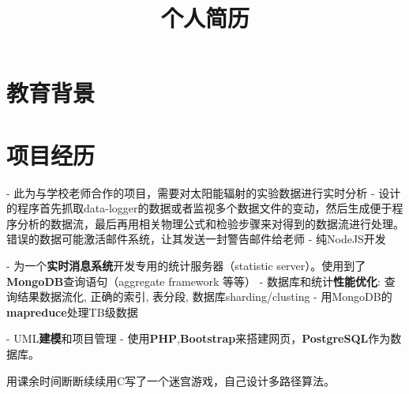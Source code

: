 \documentclass[11pt,a4paper]{moderncv}
\title{\normalsize 个人简历}
\begin{document}
\maketitle

\section{教育背景}


\section{项目经历}

{
- 此为与学校老师合作的项目，需要对太阳能辐射的实验数据进行实时分析\newline
- 设计的程序首先抓取data-logger的数据或者监视多个数据文件的变动，然后生成便于程序分析的数据流，最后再用相关物理公式和检验步骤来对得到的数据流进行处理。错误的数据可能激活邮件系统，让其发送一封警告邮件给老师\newline
- 纯NodeJS开发
}

\vspace*{0.2\baselineskip}
{
- 为一个\textbf{实时消息系统}开发专用的统计服务器（statistic server）。使用到了\textbf{MongoDB}查询语句（aggregate framework 等等）\newline
- 数据库和统计\textbf{性能优化}: 查询结果数据流化, 正确的索引, 表分段, 数据库sharding/clusting\newline
- 用MongoDB的\textbf{mapreduce}处理TB级数据
}

\vspace*{0.2\baselineskip}
{
- UML\textbf{建模}和项目管理\newline
- 使用\textbf{PHP},\textbf{Bootstrap}来搭建网页，\textbf{PostgreSQL}作为数据库。
}

\vspace*{0.2\baselineskip}
{用课余时间断断续续用C写了一个迷宫游戏，自己设计多路径算法。}
\end{document}
